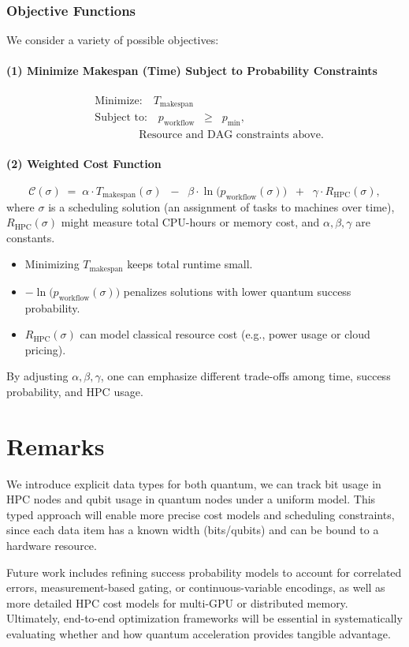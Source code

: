\documentclass{article}
\begin{document}
\subsubsection{Objective Functions}
We consider a variety of possible objectives:

\paragraph{(1) Minimize Makespan (Time) Subject to Probability Constraints}
\[
\begin{aligned}
&\text{Minimize:} \quad T_{\mathrm{makespan}} \\
&\text{Subject to:} \quad p_{\mathrm{workflow}} \;\;\ge\;\; p_{\mathrm{min}},\\
&\qquad\qquad \text{Resource and DAG constraints above.}
\end{aligned}
\]

\paragraph{(2) Weighted Cost Function}
\begin{equation}
\label{eq:weighted_obj}
\mathcal{C}(\sigma) \;=\; \alpha \cdot T_{\mathrm{makespan}}(\sigma)
\;\;-\;\;\beta \cdot \ln\bigl(p_{\mathrm{workflow}}(\sigma)\bigr)
\;\;+\;\;\gamma \cdot R_{\mathrm{HPC}}(\sigma),
\end{equation}
where $\sigma$ is a scheduling solution (an assignment of tasks to machines over time), $R_{\mathrm{HPC}}(\sigma)$ might measure total CPU-hours or memory cost, and $\alpha, \beta, \gamma$ are constants. 
\begin{itemize}
  \item Minimizing $T_{\mathrm{makespan}}$ keeps total runtime small.
  \item $-\ln\bigl(p_{\mathrm{workflow}}(\sigma)\bigr)$ penalizes solutions with lower quantum success probability.
  \item $R_{\mathrm{HPC}}(\sigma)$ can model classical resource cost (e.g., power usage or cloud pricing).
\end{itemize}
By adjusting $\alpha, \beta, \gamma$, one can emphasize different trade-offs among time, success probability, and HPC usage.


\section{Remarks}

We introduce explicit data types for both quantum, we can track bit usage in HPC nodes and qubit usage in quantum nodes under a uniform model. This typed approach will enable more precise cost models and scheduling constraints, since each data item has a known width (bits/qubits) and can be bound to a hardware resource.

Future work includes refining success probability models to account for correlated errors, measurement-based gating, or continuous-variable encodings, as well as more detailed HPC cost models for multi-GPU or distributed memory. Ultimately, end-to-end optimization frameworks will be essential in systematically evaluating whether and how quantum acceleration provides tangible advantage.
\end{document}
